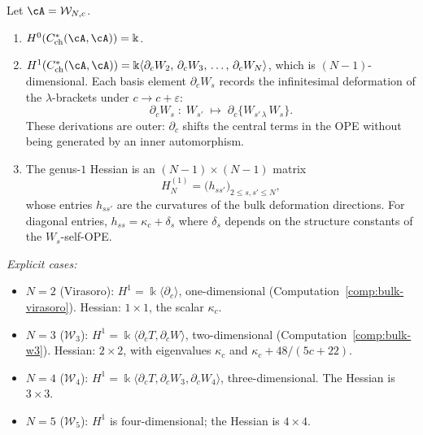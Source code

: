 \begin{computation}
\label{comp:bulk-wn-stable}
%
%
Let $\cA = \mathcal{W}_{N,c}$.
\begin{enumerate}[label=\textup{(\roman*)}]
\item $H^0(C^*_{\mathrm{ch}}(\cA, \cA)) = \Bbbk$.
\item $H^1(C^*_{\mathrm{ch}}(\cA, \cA))
 = \Bbbk\langle \partial_c W_2,\, \partial_c W_3,\,
 \ldots,\, \partial_c W_N \rangle$,
 which is $(N-1)$-dimensional. Each basis element
 $\partial_c W_s$ records the infinitesimal deformation of
 the $\lambda$-brackets under $c \to c + \varepsilon$:
 \[
 \partial_c W_s \;:\;
 W_{s'} \;\longmapsto\;
 \partial_c\{W_{s'\,\lambda}\, W_s\}.
 \]
 These derivations are outer: $\partial_c$ shifts the central
 terms in the OPE without being generated by an inner
 automorphism.
\item The genus-$1$ Hessian is an $(N-1) \times (N-1)$ matrix
 \begin{equation}
 \label{eq:wn-hessian}
 H^{(1)}_N = \bigl(h_{ss'}\bigr)_{2 \le s, s' \le N},
 \end{equation}
 whose entries $h_{ss'}$ are the curvatures of the bulk
 deformation directions. For diagonal entries,
 $h_{ss} = \kappa_c + \delta_s$ where $\delta_s$ depends on
 the structure constants of the $W_s$-self-OPE.
\end{enumerate}

\emph{Explicit cases:}
\begin{itemize}
\item $N = 2$ \textup{(Virasoro):} $H^1 = \Bbbk\langle
 \partial_c\rangle$, one-dimensional
 \textup{(}Computation~\textup{\ref{comp:bulk-virasoro})}.
 Hessian: $1 \times 1$, the scalar $\kappa_c$.
\item $N = 3$ \textup{($\mathcal{W}_3$):} $H^1 = \Bbbk\langle
 \partial_c T, \partial_c W\rangle$, two-dimensional
 \textup{(}Computation~\textup{\ref{comp:bulk-w3})}.
 Hessian: $2 \times 2$, with eigenvalues
 $\kappa_c$ and $\kappa_c + 48/(5c+22)$.
\item $N = 4$ \textup{($\mathcal{W}_4$):} $H^1 = \Bbbk\langle
 \partial_c T, \partial_c W_3, \partial_c W_4\rangle$,
 three-dimensional. The Hessian is $3 \times 3$.
\item $N = 5$ \textup{($\mathcal{W}_5$):}
 $H^1$ is four-dimensional; the Hessian is $4 \times 4$.
\end{itemize}
\end{computation}

